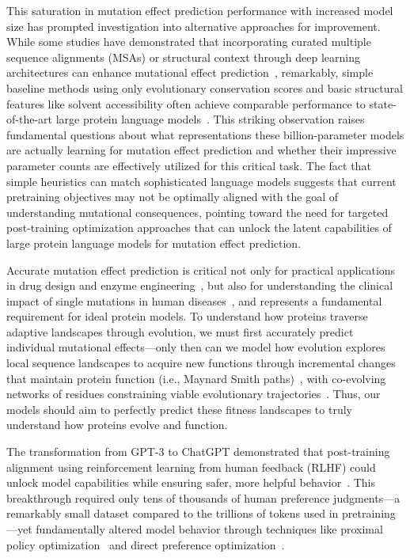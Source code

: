 \documentclass[]{fairmeta}
\begin{document}
This saturation in mutation effect prediction performance with increased model size has prompted investigation into alternative approaches for improvement. While some studies have demonstrated that incorporating curated multiple sequence alignments (MSAs) or structural context through deep learning architectures can enhance mutational effect prediction~\citep{notin2022tranception,paul2023combining}, remarkably, simple baseline methods using only evolutionary conservation scores and basic structural features like solvent accessibility often achieve comparable performance to state-of-the-art large protein language models~\citep{tsishyn2025residue}. This striking observation raises fundamental questions about what representations these billion-parameter models are actually learning for mutation effect prediction and whether their impressive parameter counts are effectively utilized for this critical task. The fact that simple heuristics can match sophisticated language models suggests that current pretraining objectives may not be optimally aligned with the goal of understanding mutational consequences, pointing toward the need for targeted post-training optimization approaches that can unlock the latent capabilities of large protein language models for mutation effect prediction.

Accurate mutation effect prediction is critical not only for practical applications in drug design and enzyme engineering~\citep{arnold2017directed,romero2009exploring}, but also for understanding the clinical impact of single mutations in human diseases~\citep{frazer2021disease,cheng2023accurate}, and represents a fundamental requirement for ideal protein models. To understand how proteins traverse adaptive landscapes through evolution, we must first accurately predict individual mutational effects—only then can we model how evolution explores local sequence landscapes to acquire new functions through incremental changes that maintain protein function (i.e., Maynard Smith paths)~\citep{maynard1970natural,weinreich2006darwinian}, with co-evolving networks of residues constraining viable evolutionary trajectories~\citep{halabi2009protein}. Thus, our models should aim to perfectly predict these fitness landscapes to truly understand how proteins evolve and function.

The transformation from GPT-3 to ChatGPT demonstrated that post-training alignment using reinforcement learning from human feedback (RLHF) could unlock model capabilities while ensuring safer, more helpful behavior~\citep{ouyang2022training}. This breakthrough required only tens of thousands of human preference judgments—a remarkably small dataset compared to the trillions of tokens used in pretraining—yet fundamentally altered model behavior through techniques like proximal policy optimization~\citep{schulman2017proximal} and direct preference optimization~\citep{rafailov2023direct,lambert2024tulu}.
\end{document}
